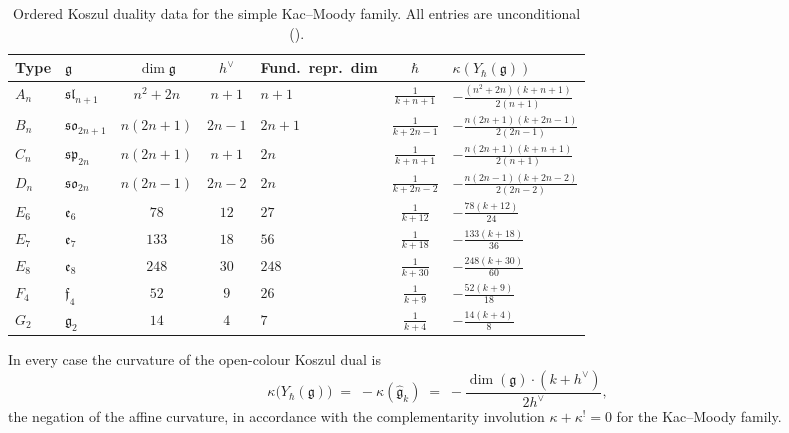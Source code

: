 \begin{table}[ht]
\centering
\caption{Ordered Koszul duality data for the simple
Kac--Moody family. All entries are unconditional
\textup{(}\ClaimStatusProvedHere\textup{)}.}
\label{tab:km-yangian-data}
\renewcommand{\arraystretch}{1.3}
\begin{tabular}{@{}llcclcl@{}}
\toprule
Type & $\mathfrak{g}$ & $\dim\mathfrak{g}$ & $h^\vee$
 & Fund.\ repr.\ dim & $\hbar$ & $\kappa(Y_\hbar(\mathfrak{g}))$ \\
\midrule
$A_n$ & $\mathfrak{sl}_{n+1}$ & $n^2+2n$ & $n+1$
 & $n+1$ & $\frac{1}{k+n+1}$
 & $-\frac{(n^2+2n)(k+n+1)}{2(n+1)}$ \\[4pt]
$B_n$ & $\mathfrak{so}_{2n+1}$ & $n(2n+1)$ & $2n-1$
 & $2n+1$ & $\frac{1}{k+2n-1}$
 & $-\frac{n(2n+1)(k+2n-1)}{2(2n-1)}$ \\[4pt]
$C_n$ & $\mathfrak{sp}_{2n}$ & $n(2n+1)$ & $n+1$
 & $2n$ & $\frac{1}{k+n+1}$
 & $-\frac{n(2n+1)(k+n+1)}{2(n+1)}$ \\[4pt]
$D_n$ & $\mathfrak{so}_{2n}$ & $n(2n-1)$ & $2n-2$
 & $2n$ & $\frac{1}{k+2n-2}$
 & $-\frac{n(2n-1)(k+2n-2)}{2(2n-2)}$ \\[4pt]
$E_6$ & $\mathfrak{e}_6$ & $78$ & $12$
 & $27$ & $\frac{1}{k+12}$
 & $-\frac{78(k+12)}{24}$ \\[4pt]
$E_7$ & $\mathfrak{e}_7$ & $133$ & $18$
 & $56$ & $\frac{1}{k+18}$
 & $-\frac{133(k+18)}{36}$ \\[4pt]
$E_8$ & $\mathfrak{e}_8$ & $248$ & $30$
 & $248$ & $\frac{1}{k+30}$
 & $-\frac{248(k+30)}{60}$ \\[4pt]
$F_4$ & $\mathfrak{f}_4$ & $52$ & $9$
 & $26$ & $\frac{1}{k+9}$
 & $-\frac{52(k+9)}{18}$ \\[4pt]
$G_2$ & $\mathfrak{g}_2$ & $14$ & $4$
 & $7$ & $\frac{1}{k+4}$
 & $-\frac{14(k+4)}{8}$ \\
\bottomrule
\end{tabular}
\end{table}

\noindent
In every case the curvature of the open-colour Koszul dual is
\begin{equation}\label{eq:km-yangian-curvature}
\kappa\bigl(Y_\hbar(\mathfrak{g})\bigr)
\;=\;
-\kappa(\widehat{\mathfrak{g}}_k)
\;=\;
-\frac{\dim(\mathfrak{g})\cdot(k+h^\vee)}{2h^\vee},
\end{equation}
the negation of the affine curvature, in accordance with the
complementarity involution $\kappa + \kappa^! = 0$ for the
Kac--Moody family.

